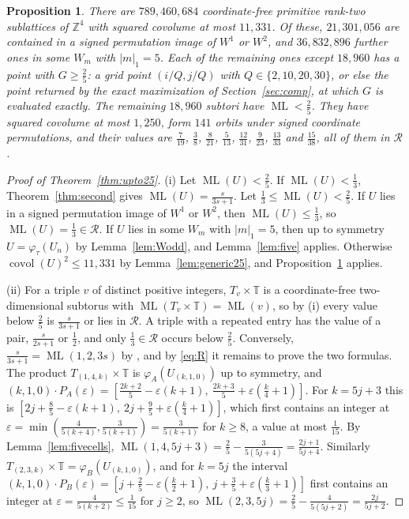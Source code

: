 \documentclass[12pt]{amsart}
\newtheorem{proposition}[theorem]{Proposition}
\theoremstyle{definition}\newtheorem{definition}[theorem]{Definition}
\theoremstyle{remark}\newtheorem{remark}[theorem]{Remark}
\newcommand{\Z}{\mathbb Z}\newcommand{\R}{\mathbb R}\newcommand{\T}{\mathbb T}
\newcommand{\ML}{\operatorname{ML}}
\newcommand{\covol}{\operatorname{covol}}
\newcommand{\Wone}{W^{1}}\newcommand{\Wtwo}{W^{2}}
\begin{document}
\begin{proposition}\label{prop:enum25}
There are $789{,}460{,}684$ coordinate-free primitive rank-two sublattices of $\Z^4$ with squared covolume at most $11{,}331$. Of these, $21{,}301{,}056$ are contained in a signed permutation image of $\Wone$ or $\Wtwo$, and $36{,}832{,}896$ further ones in some $W_m$ with $|m|_1=5$. Each of the remaining ones except $18{,}960$ has a point with $G\ge\frac25$: a grid point $(i/Q,j/Q)$ with $Q\in\{2,10,20,30\}$, or else the point returned by the exact maximization of Section~\ref{sec:comp}, at which $G$ is evaluated exactly. The remaining $18{,}960$ subtori have $\ML<\frac25$. They have squared covolume at most $1{,}250$, form $141$ orbits under signed coordinate permutations, and their values are $\frac7{19}$, $\frac38$, $\frac8{21}$, $\frac5{13}$, $\frac{12}{31}$, $\frac9{23}$, $\frac{13}{33}$ and $\frac{15}{38}$, all of them in $\mathcal R$.
\end{proposition}

\begin{proof}[Proof of Theorem~\ref{thm:upto25}]
(i) Let $\ML(U)<\frac25$. If $\ML(U)<\frac13$, Theorem~\ref{thm:second} gives $\ML(U)=\frac s{3s+1}$. Let $\frac13\le\ML(U)<\frac25$. If $U$ lies in a signed permutation image of $\Wone$ or $\Wtwo$, then $\ML(U)\le\frac13$, so $\ML(U)=\frac13\in\mathcal R$. If $U$ lies in some $W_m$ with $|m|_1=5$, then up to symmetry $U=\varphi_\tau(U_n)$ by Lemma~\ref{lem:Wodd}, and Lemma~\ref{lem:five} applies. Otherwise $\covol(U)^2\le11{,}331$ by Lemma~\ref{lem:generic25}, and Proposition~\ref{prop:enum25} applies.

(ii) For a triple $v$ of distinct positive integers, $T_v\times\T$ is a coordinate-free two-dimensional subtorus with $\ML(T_v\times\T)=\ML(v)$, so by (i) every value below $\frac25$ is $\frac s{3s+1}$ or lies in $\mathcal R$. A triple with a repeated entry has the value of a pair, $\frac s{2s+1}$ or $\frac12$, and only $\frac13\in\mathcal R$ occurs below $\frac25$. Conversely, $\frac s{3s+1}=\ML(1,2,3s)$ by \cite[Theorem~5.1]{Kravitz}, and by \eqref{eq:R} it remains to prove the two formulas. The product $T_{(1,4,k)}\times\T$ is $\varphi_A(U_{(k,1,0)})$ up to symmetry, and $(k,1,0)\cdot P_A(\varepsilon)=[\frac{2k+2}5-\varepsilon(k+1),\ \frac{2k+3}5+\varepsilon(\frac k4+1)]$. For $k=5j+3$ this is $[2j+\frac85-\varepsilon(k+1),\ 2j+\frac95+\varepsilon(\frac k4+1)]$, which first contains an integer at $\varepsilon=\min(\frac4{5(k+4)},\frac3{5(k+1)})=\frac3{5(k+1)}$ for $k\ge8$, a value at most $\frac1{15}$. By Lemma~\ref{lem:fivecells}, $\ML(1,4,5j+3)=\frac25-\frac3{5(5j+4)}=\frac{2j+1}{5j+4}$. Similarly $T_{(2,3,k)}\times\T=\varphi_B(U_{(k,1,0)})$, and for $k=5j$ the interval $(k,1,0)\cdot P_B(\varepsilon)=[j+\frac25-\varepsilon(\frac k2+1),\ j+\frac35+\varepsilon(\frac k3+1)]$ first contains an integer at $\varepsilon=\frac4{5(k+2)}\le\frac1{15}$ for $j\ge2$, so $\ML(2,3,5j)=\frac25-\frac4{5(5j+2)}=\frac{2j}{5j+2}$.
\end{proof}
\end{document}
